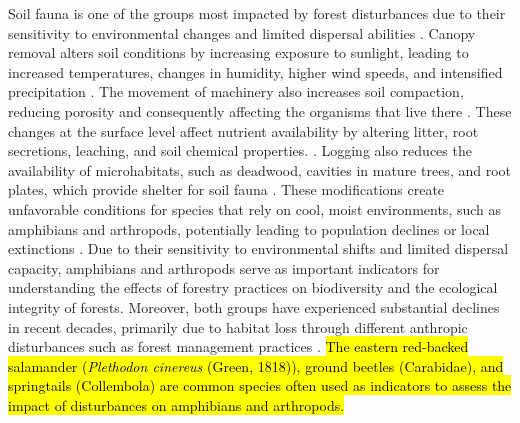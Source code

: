 Soil fauna is one of the groups most impacted by forest disturbances due to their sensitivity to environmental changes and limited dispersal abilities \citep{Marshall2000Impactsforest,Coyle2017Soilfauna}. 
Canopy removal alters soil conditions by increasing exposure to sunlight, leading to increased temperatures, changes in humidity, higher wind speeds, and intensified precipitation \citep{Keenan1993ecologicaleffects,Heithecker2007Edgerelatedgradients,Lindo2003Microbialbiomass,Brook2008Synergiesextinction,Zhang2022Intensiveforest}. 
The movement of machinery also increases soil compaction, reducing porosity and consequently affecting the organisms that live there \citep{Battigelli2004Shorttermimpact,Mazerolle2021Woodlandsalamander}. 
These changes at the surface level affect nutrient availability by altering litter, root secretions, leaching, and soil chemical properties. \citep{Covington1981Changesforest,Marshall2000Impactsforest,Lindo2003Microbialbiomass,Battigelli2004Shorttermimpact}. 
Logging also reduces the availability of microhabitats, such as deadwood, cavities in mature trees, and root plates, which provide shelter for soil fauna \citep{Spies1999Dynamicforest,Christensen2005Deadwood,Brassard2008EffectsForest}. 
These modifications create unfavorable conditions for species that rely on cool, moist environments, such as amphibians and arthropods, potentially leading to population declines or local extinctions \citep{Paillet2010Biodiversitydifferences,Fedrowitz2014Canretention,Chaudhary2016Impactforest}. 
Due to their sensitivity to environmental shifts and limited dispersal capacity, amphibians and arthropods serve as important indicators for understanding the effects of forestry practices on biodiversity and the ecological integrity of forests. 
Moreover, both groups have experienced substantial declines in recent decades, primarily due to habitat loss through different anthropic disturbances such as forest management practices \citep{Houlahan2000Quantitativeevidence,Stuart2004Statustrends,Wagner2021Insectdecline}. 
\hl{The eastern red-backed salamander (\textit{Plethodon cinereus} (Green, 1818)), ground beetles (Carabidae), and springtails (Collembola) are common species often used as indicators to assess the impact of disturbances on amphibians and arthropods. }

